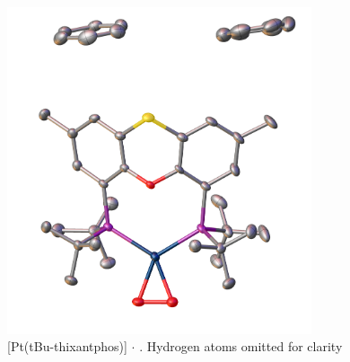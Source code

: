 
\begin{figure}[ht]
\begin{center}
\includegraphics[width=0.8\textwidth]{../Figures/Crystaldioxygen.png}
\caption[X-ray crystal structure of [Pt(tBu-thixantphos)\ce{O2}{]} $\cdot{}$ ]{[Pt(tBu-thixantphos)] $\cdot{}$ .  Hydrogen atoms omitted for clarity}
\label{crystal:dioxygen}
\end{center}
\end{figure}

